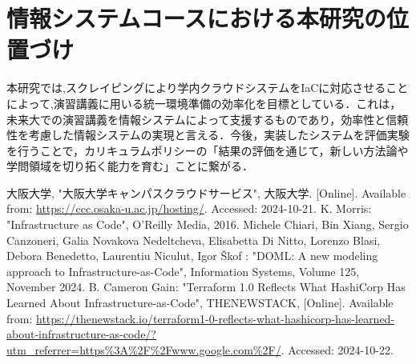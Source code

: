 \documentclass[11pt]{ujarticle}\sloppy
\begin{document}
\section{情報システムコースにおける本研究の位置づけ}

本研究では,スクレイピングにより学内クラウドシステムをIaCに対応させることによって,演習講義に用いる統一環境準備の効率化を目標としている．これは，未来大での演習講義を情報システムによって支援するものであり，効率性と信頼性を考慮した情報システムの実現と言える．今後，実装したシステムを評価実験を行うことで，カリキュラムポリシーの「結果の評価を通じて，新しい方法論や学問領域を切り拓く能力を育む」ことに繋がる．

\begin{thebibliography}{99}
	大阪大学, "大阪大学キャンパスクラウドサービス", 大阪大学. [Online]. Available from: \url{https://ccc.osaka-u.ac.jp/hosting/}. Accessed: 2024-10-21.
	K. Morris: "Infrastructure as Code", O'Reilly Media, 2016.
	Michele Chiari, Bin Xiang, Sergio Canzoneri, Galia Novakova Nedeltcheva, Elisabetta Di Nitto, Lorenzo Blasi, Debora Benedetto, Laurentiu Niculut, Igor Škof : "DOML: A new modeling approach to Infrastructure-as-Code", Information Systems, Volume 125, November 2024. 
	B. Cameron Gain: "Terraform 1.0 Reflects What HashiCorp Has Learned About Infrastructure-as-Code", THENEWSTACK, [Online]. Available from: \url{https://thenewstack.io/terraform1-0-reflects-what-hashicorp-has-learned-about-infrastructure-as-code/?utm_referrer=https%3A%2F%2Fwww.google.com%2F/}. Accessed: 2024-10-22.
\end{thebibliography}
\end{document}
